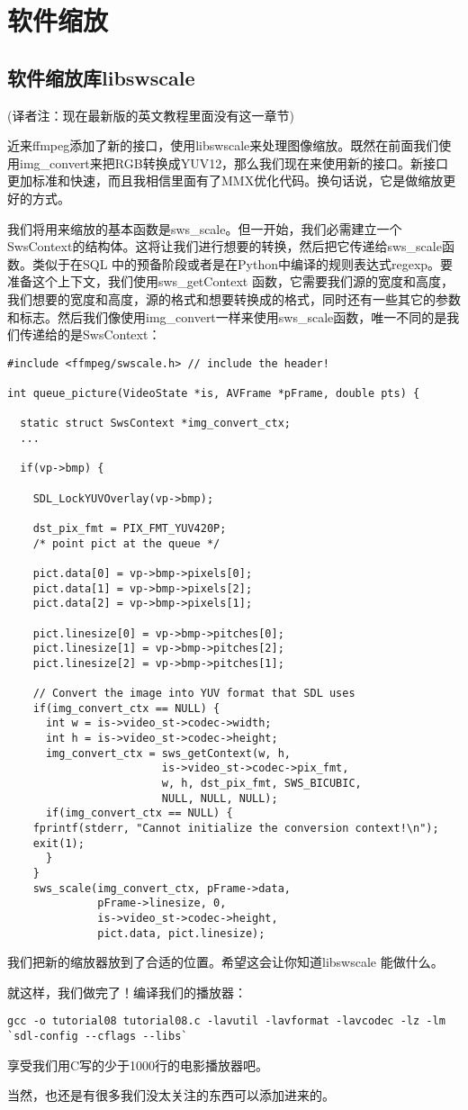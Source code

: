 ﻿\chapter{软件缩放}
\label{ch8}
\section{软件缩放库libswscale}
(译者注：现在最新版的英文教程里面没有这一章节)

近来ffmpeg添加了新的接口，使用libswscale来处理图像缩放。既然在前面我们使用img_convert来把RGB转换成YUV12，那么我们现在来使用新的接口。新接口更加标准和快速，而且我相信里面有了MMX优化代码。换句话说，它是做缩放更好的方式。

我们将用来缩放的基本函数是sws_scale。但一开始，我们必需建立一个SwsContext的结构体。这将让我们进行想要的转换，然后把它传递给sws_scale函数。类似于在SQL 中的预备阶段或者是在Python中编译的规则表达式regexp。要准备这个上下文，我们使用sws_getContext 函数，它需要我们源的宽度和高度，我们想要的宽度和高度，源的格式和想要转换成的格式，同时还有一些其它的参数和标志。然后我们像使用img_convert一样来使用sws_scale函数，唯一不同的是我们传递给的是SwsContext：
\begin{lstlisting}
#include <ffmpeg/swscale.h> // include the header!

int queue_picture(VideoState *is, AVFrame *pFrame, double pts) {

  static struct SwsContext *img_convert_ctx;
  ...

  if(vp->bmp) {

    SDL_LockYUVOverlay(vp->bmp);

    dst_pix_fmt = PIX_FMT_YUV420P;
    /* point pict at the queue */

    pict.data[0] = vp->bmp->pixels[0];
    pict.data[1] = vp->bmp->pixels[2];
    pict.data[2] = vp->bmp->pixels[1];

    pict.linesize[0] = vp->bmp->pitches[0];
    pict.linesize[1] = vp->bmp->pitches[2];
    pict.linesize[2] = vp->bmp->pitches[1];

    // Convert the image into YUV format that SDL uses
    if(img_convert_ctx == NULL) {
      int w = is->video_st->codec->width;
      int h = is->video_st->codec->height;
      img_convert_ctx = sws_getContext(w, h,
                        is->video_st->codec->pix_fmt,
                        w, h, dst_pix_fmt, SWS_BICUBIC,
                        NULL, NULL, NULL);
      if(img_convert_ctx == NULL) {
    fprintf(stderr, "Cannot initialize the conversion context!\n");
    exit(1);
      }
    }
    sws_scale(img_convert_ctx, pFrame->data,
              pFrame->linesize, 0,
              is->video_st->codec->height,
              pict.data, pict.linesize);
\end{lstlisting}

我们把新的缩放器放到了合适的位置。希望这会让你知道libswscale 能做什么。

就这样，我们做完了！编译我们的播放器：
\begin{lstlisting}
gcc -o tutorial08 tutorial08.c -lavutil -lavformat -lavcodec -lz -lm `sdl-config --cflags --libs`
\end{lstlisting}
享受我们用C写的少于1000行的电影播放器吧。

当然，也还是有很多我们没太关注的东西可以添加进来的。
